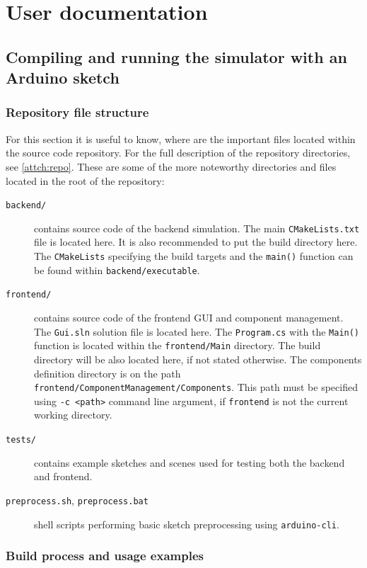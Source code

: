 \chapter{User documentation} \label{ch:docs}

\section{Compiling and running the simulator with an Arduino sketch} \label{sec:usage}

\subsection{Repository file structure}

For this section it is useful to know, where are the important files located within the source code repository. For the full description of the repository directories, see \ref{attch:repo}. These are some of the more noteworthy directories and files located in the root of the repository:

\begin{description}
    \item[\texttt{backend/}] contains source code of the backend simulation. The main \texttt{CMakeLists.txt} file is located here. It is also recommended to put the build directory here. The \texttt{CMakeLists} specifying the build targets and the \texttt{main()} function can be found within \texttt{backend/executable}.
    \item[\texttt{frontend/}] contains source code of the frontend GUI and component management. The \texttt{Gui.sln} solution file is located here. The \texttt{Program.cs} with the \texttt{Main()} function is located within the \texttt{frontend/Main} directory. The build directory will be also located here, if not stated otherwise. The components definition directory is on the path \texttt{frontend/ComponentManagement/Components}. This path must be specified using \texttt{-c <path>} command line argument, if \texttt{frontend} is not the current working directory.
    \item[\texttt{tests/}] contains example sketches and scenes used for testing both the backend and frontend.
    \item[\texttt{preprocess.sh}, \texttt{preprocess.bat}] shell scripts performing basic sketch preprocessing using \texttt{arduino-cli}. 
\end{description}

\subsection{Build process and usage examples}

